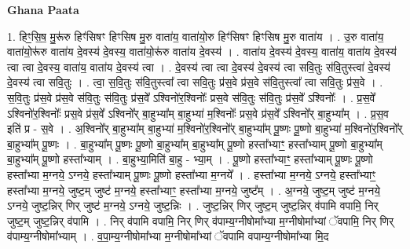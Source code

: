 \documentclass[17pt]{extarticle}
\begin{document}
\textbf{Ghana Paata } \newline

1. हिꣳ॒॒सि॒ष॒ मु॒रू॑रु हिꣳ॑सिषꣳ हिꣳसिष मु॒रु वाता॑य॒ वाता॑यो॒रु हिꣳ॑सिषꣳ हिꣳसिष मु॒रु वाता॑य । . उ॒रु वाता॑य॒ वाता॑यो॒रू॑रु वाता॑य दे॒वस्य॑ दे॒वस्य॒ वाता॑यो॒रू॑रु वाता॑य दे॒वस्य॑ । . वाता॑य दे॒वस्य॑ दे॒वस्य॒ वाता॑य॒ वाता॑य दे॒वस्य॑ त्वा त्वा दे॒वस्य॒ वाता॑य॒ वाता॑य दे॒वस्य॑ त्वा । . दे॒वस्य॑ त्वा त्वा दे॒वस्य॑ दे॒वस्य॑ त्वा सवि॒तुः स॑वि॒तुस्त्वा॑ दे॒वस्य॑ दे॒वस्य॑ त्वा सवि॒तुः । . त्वा॒ स॒वि॒तुः स॑वि॒तुस्त्वा᳚ त्वा सवि॒तुः प्र॑स॒वे प्र॑स॒वे स॑वि॒तुस्त्वा᳚ त्वा सवि॒तुः प्र॑स॒वे । . स॒वि॒तुः प्र॑स॒वे प्र॑स॒वे स॑वि॒तुः स॑वि॒तुः प्र॑स॒वे᳚ ऽश्विनो॑र॒श्विनोः᳚ प्रस॒वे स॑वि॒तुः स॑वि॒तुः प्र॑स॒वे᳚ ऽश्विनोः᳚ । . प्र॒स॒वे᳚ ऽश्विनो॑र॒श्विनोः᳚ प्रस॒वे प्र॑स॒वे᳚ ऽश्विनो᳚र् बा॒हुभ्या᳚म् बा॒हुभ्या॑ म॒श्विनोः᳚ प्रस॒वे प्र॑स॒वे᳚ ऽश्विनो᳚र् बा॒हुभ्या᳚म् । . प्र॒स॒व इति॑ प्र - स॒वे । . अ॒श्विनो᳚र् बा॒हुभ्या᳚म् बा॒हुभ्या॑ म॒श्विनो॑र॒श्विनो᳚र् बा॒हुभ्या᳚म् पू॒ष्णः पू॒ष्णो बा॒हुभ्या॑ म॒श्विनो॑र॒श्विनो᳚र् बा॒हुभ्या᳚म् पू॒ष्णः । . बा॒हुभ्या᳚म् पू॒ष्णः पू॒ष्णो बा॒हुभ्या᳚म् बा॒हुभ्या᳚म् पू॒ष्णो हस्ता᳚भ्याꣳ॒॒ हस्ता᳚भ्याम् पू॒ष्णो बा॒हुभ्या᳚म् बा॒हुभ्या᳚म् पू॒ष्णो हस्ता᳚भ्याम् । . बा॒हुभ्या॒मिति॑ बा॒हु - भ्या॒म् । . पू॒ष्णो हस्ता᳚भ्याꣳ॒॒ हस्ता᳚भ्याम् पू॒ष्णः पू॒ष्णो हस्ता᳚भ्या म॒ग्नये॒ ऽग्नये॒ हस्ता᳚भ्याम् पू॒ष्णः पू॒ष्णो हस्ता᳚भ्या म॒ग्नये᳚ । . हस्ता᳚भ्या म॒ग्नये॒ ऽग्नये॒ हस्ता᳚भ्याꣳ॒॒ हस्ता᳚भ्या म॒ग्नये॒ जुष्ट॒म् जुष्ट॑ म॒ग्नये॒ हस्ता᳚भ्याꣳ॒॒ हस्ता᳚भ्या म॒ग्नये॒ जुष्ट᳚म् । . अ॒ग्नये॒ जुष्ट॒म् जुष्ट॑ म॒ग्नये॒ ऽग्नये॒ जुष्ट॒न्निर् णिर् जुष्ट॑ म॒ग्नये॒ ऽग्नये॒ जुष्ट॒न्निः । . जुष्ट॒न्निर् णिर् जुष्ट॒म् जुष्ट॒न्निर् व॑पामि वपामि॒ निर् जुष्ट॒म् जुष्ट॒न्निर् व॑पामि । . निर् व॑पामि वपामि॒ निर् णिर् व॑पाम्य॒ग्नीषोमा᳚भ्या म॒ग्नीषोमा᳚भ्यां ॅवपामि॒ निर् णिर् व॑पाम्य॒ग्नीषोमा᳚भ्याम् । . व॒पा॒म्य॒ग्नीषोमा᳚भ्या म॒ग्नीषोमा᳚भ्यां ॅवपामि वपाम्य॒ग्नीषोमा᳚भ्या मि॒द 
\end{document}
